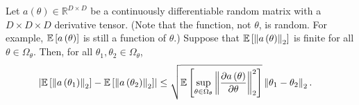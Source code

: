 %
\begin{lem}
\label{lem:lipschitz_helper}Let $a\left(\theta\right)\in\mathbb{R}^{D\times D}$
be a continuously differentiable random matrix with a $D\times D\times D$
derivative tensor. (Note that the function, not $\theta$, is random.
For example, $\mathbb{E}\left[a\left(\theta\right)\right]$ is still a function
of $\theta$.) Suppose that $\mathbb{E}\left[\left\Vert a\left(\theta\right)\right\Vert_{2}\right]$
is finite for all $\theta\in\Omega_{\theta}$. Then, for all $\theta_{1},\theta_{2}\in\Omega_{\theta}$,
\begin{align*}
\left|\mathbb{E}\left[\left\Vert a\left(\theta_{1}\right)\right\Vert_{2}\right]-\mathbb{E}\left[\left\Vert a\left(\theta_{2}\right)\right\Vert_{2}\right]\right| & \le\sqrt{\mathbb{E}\left[\sup_{\theta\in\Omega_{\theta}}\left\Vert \frac{\partial a\left(\theta\right)}{\partial\theta}\right\Vert_{2}^{2}\right]}\left\Vert \theta_{1}-\theta_{2}\right\Vert_{2}.
\end{align*}
\end{lem}
